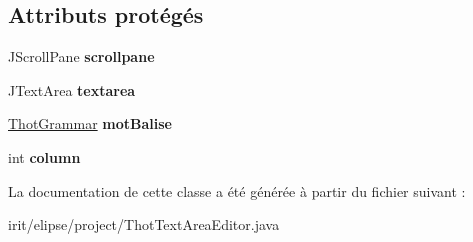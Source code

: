 \subsection*{Attributs protégés}
\begin{DoxyCompactItemize}
\item 
\mbox{\label{classfr_1_1irit_1_1elipse_1_1project_1_1_thot_text_area_editor_a3f2f3f41d67bde4b4a3cbf85c02d9296}} 
J\+Scroll\+Pane {\bfseries scrollpane}
\item 
\mbox{\label{classfr_1_1irit_1_1elipse_1_1project_1_1_thot_text_area_editor_adf5887fe1b2700e7611e49edca84af62}} 
J\+Text\+Area {\bfseries textarea}
\item 
\mbox{\label{classfr_1_1irit_1_1elipse_1_1project_1_1_thot_text_area_editor_aea460b355ba51208d00e143018ae6370}} 
\mbox{\hyperlink{classfr_1_1irit_1_1elipse_1_1project_1_1_thot_grammar}{Thot\+Grammar}} {\bfseries mot\+Balise}
\item 
\mbox{\label{classfr_1_1irit_1_1elipse_1_1project_1_1_thot_text_area_editor_a4202960217ac1cb5dbc242d8940330b3}} 
int {\bfseries column}
\end{DoxyCompactItemize}


La documentation de cette classe a été générée à partir du fichier suivant \+:\begin{DoxyCompactItemize}
\item 
irit/elipse/project/Thot\+Text\+Area\+Editor.\+java\end{DoxyCompactItemize}
